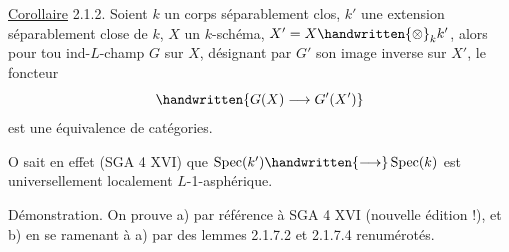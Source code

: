 \reversemarginpar
{}
\normalmarginpar
\uline{Corollaire} 2.1.2. Soient $k$ un corps séparablement clos, $k'$ une extension séparablement close de $k$, $X$ un $k$-schéma, $X'=X\handwritten{\otimes}_k k'$, alors pour tou  ind-\uline{$L$}-champ $G$ sur $X$, désignant par $G'$ son image inverse sur $X'$, le foncteur
\[
\handwritten{G(X)\longrightarrow G'(X')}
\]
est une équivalence de catégories.

O sait en effet (SGA 4 XVI\quad\quad) que $\operatorname{Spec}(k')\handwritten{\longrightarrow}\operatorname{Spec}(k)$ est universellement localement \uline{$L$}-1-asphérique.

Démonstration. On prouve a) par référence à SGA 4 XVI (nouvelle édition !), et b) en se ramenant à a) par des lemmes 2.1.7.2 et 2.1.7.4 renumérotés.


